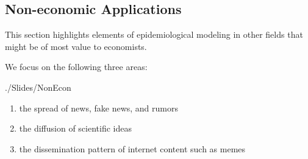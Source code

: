 \subsection{Non-economic Applications}\label{subsec:nonecon}\hypertarget{nonecon}{}

This section highlights elements of epidemiological modeling in other fields that might be of most value to economists.   


We focus on the following three areas:
\begin{verbatimwrite}{./Slides/NonEcon}
\begin{enumerate}
    \item the spread of news, fake news, and rumors
    \item the diffusion of scientific ideas
    \item the dissemination pattern of internet content such as memes
\end{enumerate}
\end{verbatimwrite}

